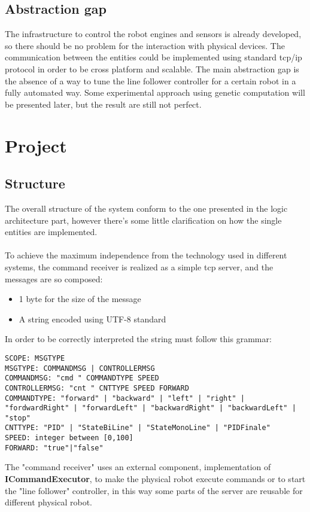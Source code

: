 \documentclass{llncs}
\newcommand{\labelsec}[1]{\label{sec:#1}}
\begin{document}
\subsection{Abstraction gap}
The infrastructure to control the robot engines and sensors is already developed, so there should be no problem for the interaction with physical devices. The communication between the entities could be implemented using standard tcp/ip protocol in order to be cross platform and scalable. The main abstraction gap is the absence of a way to tune the line follower controller for a certain robot in a fully automated way. Some experimental approach using genetic computation will be presented later, but the result are still not perfect.    

\newpage
\section{Project}
\labelsec{Project}

\subsection{Structure}
The overall structure of the system conform to the one presented in the logic architecture part, however there's some little clarification on how the single entities are implemented.\\

\\
To achieve the maximum independence from the technology used in different systems, the command receiver is realized as a simple tcp server, and the messages are so composed:
\begin{itemize}
	\item 1 byte for the size of the message
	\item A string encoded using UTF-8 standard
\end{itemize} 
In order to be correctly interpreted the string must follow this grammar:
\lstset{language=Java}
\begin{lstlisting}
SCOPE: MSGTYPE
MSGTYPE: COMMANDMSG | CONTROLLERMSG
COMMANDMSG: "cmd " COMMANDTYPE SPEED
CONTROLLERMSG: "cnt " CNTTYPE SPEED FORWARD
COMMANDTYPE: "forward" | "backward" | "left" | "right" | "fordwardRight" | "forwardLeft" | "backwardRight" | "backwardLeft" | "stop"
CNTTYPE: "PID" | "StateBiLine" | "StateMonoLine" | "PIDFinale"
SPEED: integer between [0,100]
FORWARD: "true"|"false"
\end{lstlisting}
The "command receiver" uses an external component, implementation of \textbf{ICommandExecutor}, to make the physical robot execute commands or to start the "line follower" controller, in this way some parts of the server are reusable for different physical robot.\\
\end{document}
